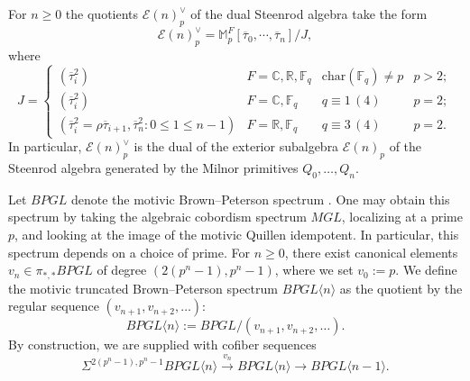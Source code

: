 \documentclass{amsart}
\theoremstyle{plain}
\numberwithin{theorem}{section}
\numberwithin{equation}{section}
\numberwithin{figure}{section}
\newcommand{\cE}{{\mathcal E}}
\newcommand{\0}{\langle 0 \rangle }
\begin{document}
For $n \geq 0$ the quotients $\mathcal{E}(n)_p^\vee$ of the dual Steenrod algebra take the form
\[
\cE(n)^\vee_p = 
\mathbb{M}_p^F[\overline{\tau}_0, \cdots, \overline{\tau}_n]/J,
\]
where
\begin{equation}
\label{eq:EnRelations}
    J = \left\{ \begin{array}{llrr}
   (\overline{\tau}_i^2)  & F =\mathbb{C}, \mathbb{R}, \mathbb{F}_q&\text{char}(\mathbb{F}_q)\neq p&p>2;  \\
   (\overline{\tau}_i^2) & F = \mathbb{C}, \mathbb{F}_q &q \equiv 1 \, (4)&p=2;\\
   (\overline{\tau}_i^2=\rho\overline{\tau}_{i+1}, \overline{\tau}_n^2: 0 \leq 1 \leq n-1)  & F = \mathbb{R}, \mathbb{F}_q&q \equiv 3 \, (4)&p=2.
\end{array} \right.
\end{equation}
In particular, $\mathcal{E}(n)^\vee_p$ is the dual of the exterior subalgebra $\mathcal{E}(n)_p$ of the Steenrod algebra generated by the Milnor primitives $Q_0, \dots, Q_n$.

Let $BPGL$ denote the motivic Brown--Peterson spectrum \cite{HuKriz01,Hoyois15}. One may obtain this spectrum by taking the algebraic cobordism spectrum $MGL$, localizing at a prime $p$, and looking at the image of the motivic Quillen idempotent. In particular, this spectrum depends on a choice of prime. For $n \geq 0$, there exist canonical elements $v_n \in \pi_{*,*}BPGL$ of degree $(2(p^n-1), p^n-1)$, where we set $v_0:=p$. We define the motivic truncated Brown--Peterson spectrum $BPGL \langle n \rangle$ as the quotient by the regular sequence $(v_{n+1}, v_{n+2}, \dots)$:
\[BPGL \langle n \rangle := BPGL/(v_{n+1}, v_{n+2}, \dots).\]
By construction, we are supplied with cofiber sequences
\begin{equation} \label{eq:BPGLcofib}
    \Sigma^{2(p^n-1), p^n-1}BPGL \langle n \rangle \xrightarrow{v_n}BPGL \langle n \rangle \to BPGL \langle n-1 \rangle.
\end{equation}










\end{document}
